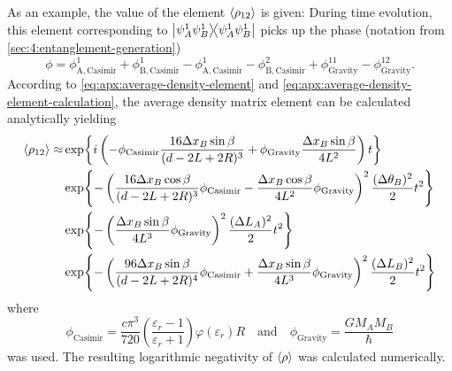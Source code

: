 As an example, the value of the element $\left\langle\rho_{12}\right\rangle$ is given:
During time evolution, this element corresponding to $\ketbra{\psi_A^1\psi_B^1}{\psi_A^1\psi_B^1}$ picks up the phase (notation from \cref{sec:4:entanglement-generation})
\begin{equation}
  \phi = \phi^1_\mathrm{A,Casimir} + \phi^1_\mathrm{B,Casimir} - \phi^1_\mathrm{A,Casimir} - \phi^2_\mathrm{B,Casimir} + \phi^{11}_\mathrm{Gravity} - \phi^{12}_\mathrm{Gravity} .
\end{equation}
According to \eqref{eq:apx:average-density-element} and \eqref{eq:apx:average-density-element-calculation}, the average density matrix element can be calculated analytically yielding
\begin{align} \label{eq:apx:averagted-state-element}
  \left\langle\rho_{12}\right\rangle \approx & \exp{i \left( -\phi_\mathrm{Casimir}\frac{16\Delta x_B \sin\beta}{(d-2L+2R)^3} + \phi_\mathrm{Gravity}\frac{\Delta x_B\sin\beta}{4L^2} \right) t} \\
  & \exp{-\left(\frac{16\Delta x_B \cos\beta}{(d-2L+2R)^3}\phi_\mathrm{Casimir} - \frac{\Delta x_B \cos\beta}{4L^2}\phi_\mathrm{Gravity}\right)^2 \frac{(\Delta \theta_B)^2}{2} t^2} \\
  & \exp{-\left(\frac{\Delta x_B \sin\beta}{4L^3}\phi_\mathrm{Gravity}\right)^2 \frac{(\Delta L_A)^2}{2} t^2} \\
  & \exp{-\left(\frac{96\Delta x_B \sin\beta}{(d-2L+2R)^4}\phi_\mathrm{Casimir} + \frac{\Delta x_B \sin\beta}{4L^3}\phi_\mathrm{Gravity}\right)^2 \frac{(\Delta L_B)^2}{2} t^2}
\end{align}
where
\begin{equation}
  \phi_\mathrm{Casimir} = \frac{c \pi^3}{720} \left(\frac{\varepsilon_r-1}{\varepsilon_r+1}\right) \varphi(\varepsilon_r) R
  \quad \text{and}\quad 
  \phi_\mathrm{Gravity} = \frac{GM_AM_B}{\hbar}
\end{equation}
was used.
The resulting logarithmic negativity of $\left\langle\rho\right\rangle$ was calculated numerically.